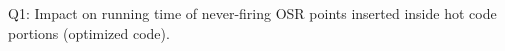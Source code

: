 \label{fig:code-quality-O1} Q1: Impact on running time of never-firing OSR points inserted inside hot code portions (optimized code).
  
  
  
